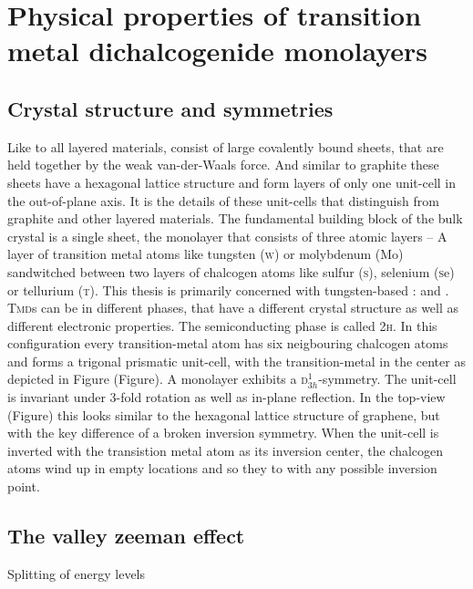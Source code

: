 \chapter{Physical properties of transition metal dichalcogenide monolayers}

\section{Crystal structure and symmetries}

Like to all layered materials, \tmds consist of large covalently bound sheets, that are held together by the weak van-der-Waals force. And similar to graphite these sheets have a hexagonal lattice structure and form layers of only one unit-cell in the out-of-plane axis. It is the details of these unit-cells that distinguish \tmds from graphite and other layered materials. The fundamental building block of the bulk crystal is a single sheet, the monolayer that consists of three atomic layers -- A layer of transition metal atoms like tungsten (\textsc{w}) or molybdenum (\textsc{M}{\footnotesize o}) sandwitched between two layers of chalcogen atoms like sulfur (\textsc{s}), selenium (\textsc{s}{\footnotesize e}) or tellurium (\textsc{t}). This thesis is primarily concerned with tungsten-based \tmds\-: \wse and \ws. \textsc{Tmd}s can be in different phases, that have a different crystal structure as well as different electronic properties. The semiconducting phase is called 2\textsc{h}. In this configuration every transition-metal atom has six neigbouring chalcogen atoms and forms a trigonal prismatic unit-cell, with the transition-metal in the center as depicted in Figure (Figure). A \tmdg monolayer exhibits a \textsc{d}$^1_{3h}$-symmetry. The unit-cell is invariant under 3-fold rotation as well as in-plane reflection. In the top-view (Figure) this looks similar to the hexagonal lattice structure of graphene, but with the key difference of a broken inversion symmetry. When the unit-cell is inverted with the transistion metal atom as its inversion center, the chalcogen atoms wind up in empty locations and so they to with any possible inversion point. 

\section{The valley zeeman effect}

Splitting of energy levels \cite{srivastava_valley_2015}